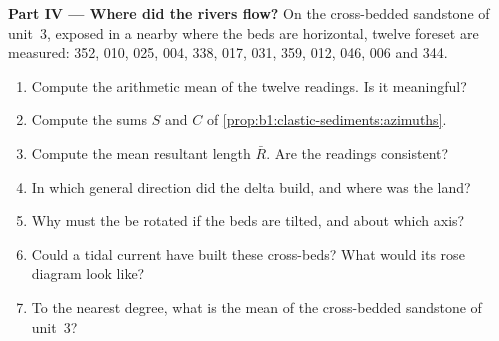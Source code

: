 \begin{problem}
\medskip
\noindent\textbf{Part IV --- Where did the rivers flow?}
On the cross-bedded sandstone of unit~3, exposed in a nearby  where the
beds are horizontal, twelve foreset  are measured: 352, 010, 025,
004, 338, 017, 031, 359, 012, 046, 006 and 344.
\begin{enumerate}[resume]
  \item Compute the arithmetic mean of the twelve readings. Is it meaningful?
  \item Compute the sums $S$ and $C$ of \cref{prop:b1:clastic-sediments:azimuths}.
  \item Compute the mean resultant length $\bar R$. Are the readings
        consistent?
  \item In which general direction did the delta build, and where was the land?
  \item Why must the  be rotated if the beds are tilted, and
        about which axis?
  \item Could a tidal current have built these cross-beds? What would its
        rose diagram look like?
  \item To the nearest degree, what is the mean   of the
        cross-bedded sandstone of unit~3?
\end{enumerate}
\end{problem}
